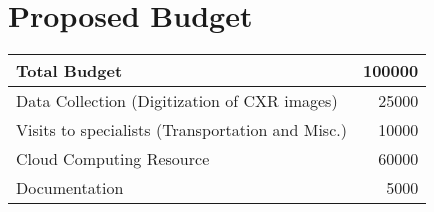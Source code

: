 \section{Proposed Budget}

\begin{table}[!ht]
    \centering
    \begin{tabular}{|l|r|}
    \hline
        Total Budget & 100000 \\ \hline
        Data Collection (Digitization of CXR images) & 25000 \\ \hline
        Visits to specialists (Transportation and Misc.) & 10000 \\ \hline
        Cloud Computing Resource & 60000 \\ \hline
        Documentation & 5000 \\ \hline
    \end{tabular}
\end{table}
